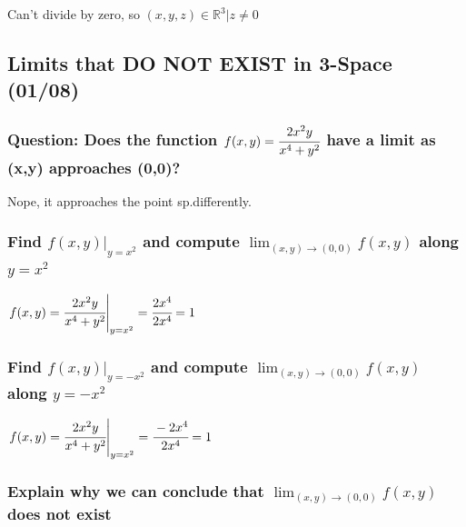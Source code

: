 \documentclass[
  letterpaper,
  DIV=11,
  numbers=noendperiod]{scrartcl}
\begin{document}
Can't divide by zero, so \((x, y, z) \in \mathbb{R}^3 | z \ne 0\)

\subsection{Limits that DO NOT EXIST in 3-Space
(01/08)}\label{limits-that-do-not-exist-in-3-space-0108}

\subsubsection{\texorpdfstring{Question: Does the function
\(f(x,y) = \cfrac{2x^2y}{x^4+y^2}\) have a limit as (x,y) approaches
(0,0)?}{Question: Does the function f(x,y) = \textbackslash cfrac\{2x\^{}2y\}\{x\^{}4+y\^{}2\} have a limit as (x,y) approaches (0,0)?}}\label{question-does-the-function-fxy-cfrac2x2yx4y2-have-a-limit-as-xy-approaches-00}

Nope, it approaches the point sp.differently.

\subsubsection{\texorpdfstring{Find \(\left.f(x, y)\right\vert_{y=x^2}\)
and compute \(\lim_{(x, y) \rightarrow (0, 0)} f(x, y)\) along
\(y=x^2\)}{Find \textbackslash left.f(x, y)\textbackslash right\textbackslash vert\_\{y=x\^{}2\} and compute \textbackslash lim\_\{(x, y) \textbackslash rightarrow (0, 0)\} f(x, y) along y=x\^{}2}}\label{find-left.fx-yrightvert_yx2-and-compute-lim_x-y-rightarrow-0-0-fx-y-along-yx2}

\(\left.f(x,y) = \cfrac{2x^2y}{x^4 +y^2}\right\vert_{y=x^2} = \cfrac{2x^4}{2x^4} = 1\)

\subsubsection{\texorpdfstring{Find
\(\left.f(x, y)\right\vert_{y=-x^2}\) and compute
\(\lim_{(x, y) \rightarrow (0, 0)} f(x, y)\) along
\(y=-x^2\)}{Find \textbackslash left.f(x, y)\textbackslash right\textbackslash vert\_\{y=-x\^{}2\} and compute \textbackslash lim\_\{(x, y) \textbackslash rightarrow (0, 0)\} f(x, y) along y=-x\^{}2}}\label{find-left.fx-yrightvert_y-x2-and-compute-lim_x-y-rightarrow-0-0-fx-y-along-y-x2}

\(\left.f(x,y) = \cfrac{2x^2y}{x^4 +y^2}\right\vert_{y=x^2} = \cfrac{-2x^4}{2x^4} = 1\)

\subsubsection{\texorpdfstring{Explain why we can conclude that
\(\lim_{(x, y) \rightarrow (0, 0)} f(x,y)\) does not
exist}{Explain why we can conclude that \textbackslash lim\_\{(x, y) \textbackslash rightarrow (0, 0)\} f(x,y) does not exist}}\label{explain-why-we-can-conclude-that-lim_x-y-rightarrow-0-0-fxy-does-not-exist}
\end{document}
